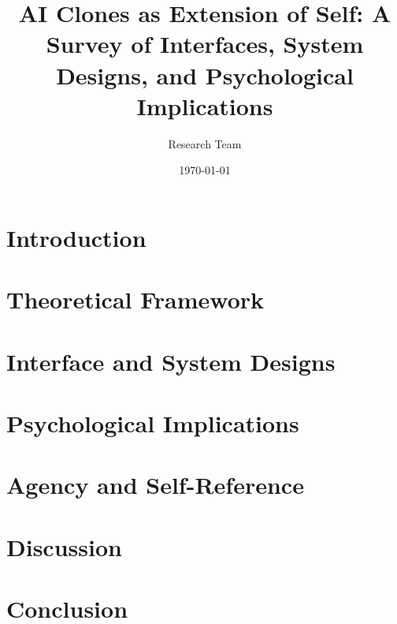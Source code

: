 \documentclass[12pt,a4paper]{article}
\title{AI Clones as Extension of Self: A Survey of Interfaces, System Designs, and Psychological Implications}
\author{Research Team}
\date{\today}
\begin{document}
\maketitle
\tableofcontents
\newpage

\section{Introduction}


\section{Theoretical Framework}


\section{Interface and System Designs}


\section{Psychological Implications}


\section{Agency and Self-Reference}


\section{Discussion}


\section{Conclusion}




\end{document}
